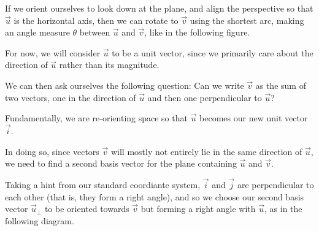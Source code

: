 \documentclass{ximera}
\begin{document}
    If we orient ourselves to look down at the plane, and align the perspective so that $\vec{u}$ is the horizontal axis, then we can rotate to $\vec{v}$ using the shortest arc, making an angle measure $\theta$ between $\vec{u}$ and $\vec{v}$, like in the following figure.

    \begin{center}
      \end{center}

   For now, we will consider $\vec{u}$ to be a unit vector, since we primarily care about the direction of $\vec{u}$ rather than its magnitude. 

   We can then ask ourselves the following question: Can we write $\vec{v}$ as the sum of two vectors, one in the direction of $\vec{u}$ and then one perpendicular to $\vec{u}$?

   Fundamentally, we are re-orienting space so that $\vec{u}$ becomes our new unit vector $\vec{i}$.

   In doing so, since vectors $\vec{v}$ will mostly not entirely lie in the same direction of $\vec{u}$, we need to find a second basis vector for the plane containing $\vec{u}$ and $\vec{v}$. 

   Taking a hint from our standard coordiante system, $\vec{i}$ and $\vec{j}$ are perpendicular to each other (that is, they form a right angle), and so we choose our second basis vector $\vec{u}_\perp$ to be oriented towards $\vec{v}$ but forming a right angle with $\vec{u}$, as in the following diagram.
     
    \begin{center}
     
    \end{center}
\end{document}
